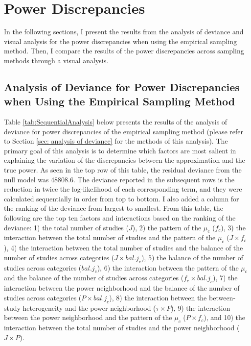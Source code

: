 \section{Power Discrepancies}

In the following sections, I present the results from the analysis of deviance and visual analysis for the power discrepancies when using the empirical sampling method. Then, I compare the results of the power discrepancies across sampling methods through a visual analysis.   

\subsection{Analysis of Deviance for Power Discrepancies when Using the Empirical Sampling Method} \label{sec: analysis of deviance - empirical}

Table \ref{tab:SequentialAnalysis} below presents the results of the analysis of deviance for power discrepancies of the empirical sampling method (please refer to Section \ref{sec: analysis of deviance} for the methods of this analysis). The primary goal of this analysis is to determine which factors are most salient in explaining the variation of the discrepancies between the approximation and the true power. As seen in the top row of this table, the residual deviance from the null model was 48808.6. The deviance reported in the subsequent rows is the reduction in twice the log-likelihood of each corresponding term, and they were calculated sequentially in order from top to bottom. I also added a column for the ranking of the deviance from largest to smallest. From this table, the following are the top ten factors and interactions based on the ranking of the deviance: 1) the total number of studies ($J$), 2) the pattern of the $\mu_c$ ($f_c$), 3) the interaction between the total number of studies and the pattern of the $\mu_c$  ($J \times f_c$), 4) the interaction between the total number of studies and the balance of the number of studies across categories ($J \times bal. j_c$), 5) the balance of the number of studies across categories ($bal. j_c$), 6) the interaction between the pattern of the $\mu_c$ and the balance of the number of studies across categories ($f_c \times bal. j_c$), 7) the interaction between the power neighborhood and the balance of the number of studies across categories ($P \times bal. j_c$), 8) the interaction between the between-study heterogeneity and the power neighborhood ($\tau \times P$), 9) the interaction between the power neighborhood and the pattern of the $\mu_c$ ($P \times f_c$), and 10) the interaction between the total number of studies and the power neighborhood  ($J \times P$). 

